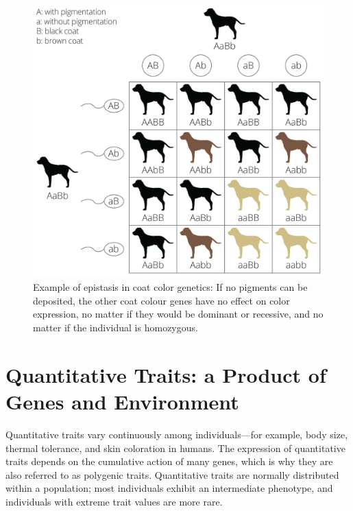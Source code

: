 \documentclass[
]{book}
\begin{document}
\begin{figure}
\includegraphics[width=1\linewidth]{images/epistasis} \caption{Example of epistasis in coat color genetics: If no pigments can be deposited, the other coat colour genes have no effect on color expression, no matter if they would be dominant or recessive, and no matter if the individual is homozygous.}\label{fig:epistasis}
\end{figure}

\hypertarget{quantitative-traits-a-product-of-genes-and-environment}{%
\section{Quantitative Traits: a Product of Genes and Environment}\label{quantitative-traits-a-product-of-genes-and-environment}}

Quantitative traits vary continuously among individuals---for example, body size, thermal tolerance, and skin coloration in humans. The expression of quantitative traits depends on the cumulative action of many genes, which is why they are also referred to as polygenic traits. Quantitative traits are normally distributed within a population; most individuals exhibit an intermediate phenotype, and individuals with extreme trait values are more rare.
\end{document}
